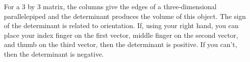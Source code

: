 For a 3 by 3 matrix, the columns give the edges of a three-dimensional parallelepiped and the determinant produces the volume of this object. The sign of the determinant is related to orientation. If, using your right hand, you can place your index finger on the first vector, middle finger on the second vector, and thumb on the third vector, then the determinant is positive.  If you can't, then the determinant is negative.
